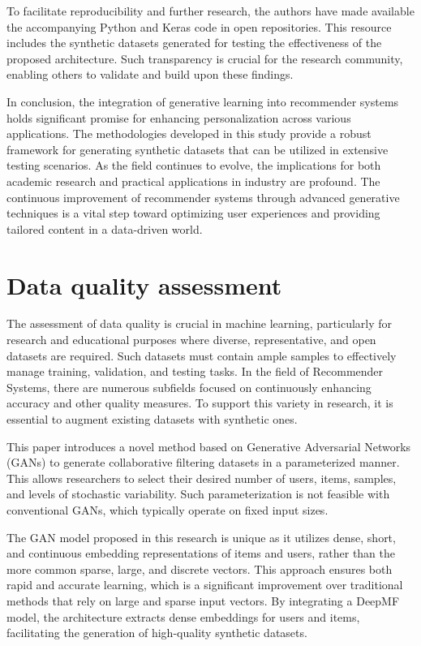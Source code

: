\documentclass[runningheads]{llncs}
\begin{document}
To facilitate reproducibility and further research, the authors have made available the accompanying Python and Keras code in open repositories. This resource includes the synthetic datasets generated for testing the effectiveness of the proposed architecture. Such transparency is crucial for the research community, enabling others to validate and build upon these findings.

In conclusion, the integration of generative learning into recommender systems holds significant promise for enhancing personalization across various applications. The methodologies developed in this study provide a robust framework for generating synthetic datasets that can be utilized in extensive testing scenarios. As the field continues to evolve, the implications for both academic research and practical applications in industry are profound. The continuous improvement of recommender systems through advanced generative techniques is a vital step toward optimizing user experiences and providing tailored content in a data-driven world.
\section{Data quality assessment}
The assessment of data quality is crucial in machine learning, particularly for research and educational purposes where diverse, representative, and open datasets are required. Such datasets must contain ample samples to effectively manage training, validation, and testing tasks. In the field of Recommender Systems, there are numerous subfields focused on continuously enhancing accuracy and other quality measures. To support this variety in research, it is essential to augment existing datasets with synthetic ones.

This paper introduces a novel method based on Generative Adversarial Networks (GANs) to generate collaborative filtering datasets in a parameterized manner. This allows researchers to select their desired number of users, items, samples, and levels of stochastic variability. Such parameterization is not feasible with conventional GANs, which typically operate on fixed input sizes.

The GAN model proposed in this research is unique as it utilizes dense, short, and continuous embedding representations of items and users, rather than the more common sparse, large, and discrete vectors. This approach ensures both rapid and accurate learning, which is a significant improvement over traditional methods that rely on large and sparse input vectors. By integrating a DeepMF model, the architecture extracts dense embeddings for users and items, facilitating the generation of high-quality synthetic datasets.
\end{document}
